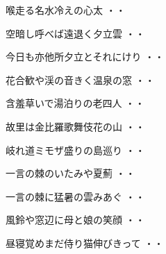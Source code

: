 \vspace{0.6cm}
\begin{shiika}喉走る名水冷えの心太
\hfill{・・}\end{shiika}
\vspace{0.6cm}
\begin{shiika}空暗し呼べば遠退く夕立雲
\hfill{・・}\end{shiika}
\vspace{0.6cm}
\begin{shiika}今日も亦他所夕立とそれにけり
\hfill{・・}\end{shiika}
\vspace{0.6cm}
\begin{shiika}花合歓や渓の音きく温泉の窓
\hfill{・・}\end{shiika}
\vspace{0.6cm}
\begin{shiika}含羞草いで湯泊りの老四人
\hfill{・・}\end{shiika}
\vspace{0.6cm}
\begin{shiika}故里は金比羅歌舞伎花の山
\hfill{・・}\end{shiika}
\vspace{0.6cm}
\begin{shiika}岐れ道ミモザ盛りの島巡り
\hfill{・・}\end{shiika}
\vspace{0.6cm}
\begin{shiika}一言の棘のいたみや夏薊
\hfill{・・}\end{shiika}
\vspace{0.6cm}
\begin{shiika}一言の棘に猛暑の雲みあぐ
\hfill{・・}\end{shiika}
\vspace{0.6cm}
\begin{shiika}風鈴や窓辺に母と娘の笑顔
\hfill{・・}\end{shiika}
\vspace{0.6cm}
\begin{shiika}昼寝覚めまだ侍り猫伸びきって
\hfill{・・}\end{shiika}
\vspace{0.6cm}
